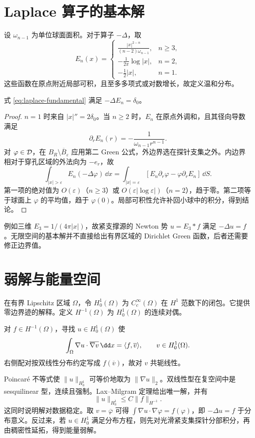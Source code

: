 \section{Laplace 算子的基本解}
设 $\omega_{n-1}$ 为单位球面面积。对于算子 $-\Delta$，取
\begin{equation}\label{eq:laplace-fundamental}
 E_n(x)=\begin{cases}
 \displaystyle\frac{|x|^{2-n}}{(n-2)\omega_{n-1}},&n\ge3,\\[4pt]
 \displaystyle-\frac1{2\pi}\log|x|,&n=2,\\[4pt]
 \displaystyle-\frac12|x|,&n=1.
 \end{cases}
\end{equation}
这些函数在原点附近局部可积，且至多多项式或对数增长，故定义温和分布。
\begin{theorem}
式 \eqref{eq:laplace-fundamental} 满足 $-\Delta E_n=\delta_0$。
\end{theorem}
\begin{proof}
$n=1$ 时来自 $|x|''=2\delta_0$。当 $n\ge2$ 时，$E_n$ 在原点外调和，且其径向导数满足
\[
 \partial_rE_n(r)=-\frac1{\omega_{n-1}r^{n-1}}.
\]
对 $\varphi\in\mathcal{D}$，在 $B_R\setminus\overline B_\varepsilon$ 应用第二 Green 公式，外边界选在探针支集之外。内边界相对于穿孔区域的外法向为 $-e_r$，故
\[
 \int_{|x|>\varepsilon}E_n(-\Delta\varphi)\,\dd x
 =\int_{|x|=\varepsilon}
 [E_n\partial_r\varphi-\varphi\partial_rE_n]\,\dd S.
\]
第一项的绝对值为 $O(\varepsilon)$（$n\ge3$）或 $O(\varepsilon|\log\varepsilon|)$（$n=2$），趋于零。第二项等于球面上 $\varphi$ 的平均值，趋于 $\varphi(0)$。局部可积性允许补回小球中的积分，得到结论。
\end{proof}
例如三维 $E_3=1/(4\pi|x|)$，故紧支撑源的 Newton 势 $u=E_3*f$ 满足 $-\Delta u=f$。无限空间的基本解并不直接给出有界区域的 Dirichlet Green 函数，后者还需要修正边界值。

\section{弱解与能量空间}
在有界 Lipschitz 区域 $\Omega$，令 $H_0^1(\Omega)$ 为 $C_c^\infty(\Omega)$ 在 $H^1$ 范数下的闭包。它提供零边界迹的解释。定义 $H^{-1}(\Omega)$ 为 $H_0^1(\Omega)$ 的连续对偶。
\begin{definition}
对 $f\in H^{-1}(\Omega)$，寻找 $u\in H_0^1(\Omega)$ 使
\begin{equation}\label{eq:weak-poisson}
 \int_\Omega\nabla u\cdot\overline{\nabla v}\,\dd x
 =\Pair{f}{\overline v},\qquad v\in H_0^1(\Omega).
\end{equation}
右侧配对按双线性分布约定写成 $f(\overline v)$，故对 $v$ 共轭线性。
\end{definition}
Poincaré 不等式使 $\|u\|_{H_0^1}$ 可等价地取为 $\|\nabla u\|_2$。双线性型在复空间中是 sesquilinear 型，连续且强制。Lax--Milgram 定理给出唯一解，并有
\[
 \|u\|_{H_0^1}\le C\|f\|_{H^{-1}}.
\]
这同时说明解对数据稳定。取 $v=\overline\varphi$ 可得 $\int\nabla u\cdot\nabla\varphi=f(\varphi)$，即 $-\Delta u=f$ 于分布意义。反过来，若 $u\in H_0^1$ 满足分布方程，则先对光滑紧支集探针分部积分，再由稠密性延拓，得到能量弱解。

